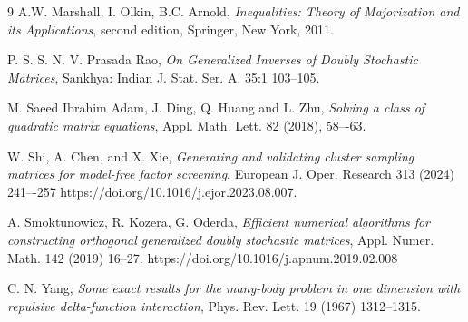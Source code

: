 \documentclass{article}
\theoremstyle{definition}\newtheorem{example}{Example}[section]
\begin{document}
\begin{thebibliography}{9}
		 A.W. Marshall, I. Olkin, B.C. Arnold, {\it Inequalities: Theory of Majorization and its Applications}, second edition, Springer, New York, 2011.
		
		 P. S. S. N. V. Prasada Rao, {\it On Generalized Inverses of Doubly Stochastic Matrices}, Sankhya: Indian J. Stat. Ser. A. 35:1 103--105.
		
		 M. Saeed Ibrahim Adam, J. Ding, Q. Huang and L. Zhu, {\it Solving a class of
			quadratic matrix equations}, Appl. Math. Lett. 82 (2018), 58–-63.
		
		 W. Shi, A. Chen, and X. Xie, {\it Generating and validating cluster sampling matrices for model-free factor screening}, European J. Oper. Research 313 (2024) 241–-257 https://doi.org/10.1016/j.ejor.2023.08.007.
		
		 A. Smoktunowicz, R. Kozera, G. Oderda, {\it Efficient numerical algorithms for constructing orthogonal generalized doubly stochastic matrices}, Appl. Numer. Math. 142 (2019) 16--27. https://doi.org/10.1016/j.apnum.2019.02.008
		
		
		 C. N. Yang, {\it Some exact results for the many-body problem in one dimension with repulsive delta-function interaction}, Phys. Rev. Lett. 19 (1967) 1312–1315.
		
		
		
	\end{thebibliography}
	
	
\end{document}
